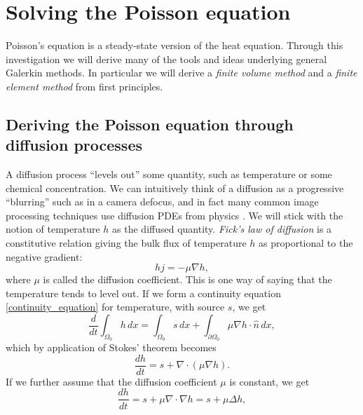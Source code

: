 \documentclass[11pt,a4paper]{memoir}
\newcommand{\pomn}{{\partial\Omega_0}}
\begin{document}
\section{Solving the Poisson equation}
Poisson's equation is a steady-state version of the heat equation.
Through this investigation we will derive many of the tools and ideas underlying general Galerkin methods.
In particular we will derive a \textit{finite volume method} and a \textit{finite element method} from first principles.

\subsection{Deriving the Poisson equation through diffusion processes}
A diffusion process ``levels out'' some quantity, such as temperature or some chemical concentration. We can intuitively think of a diffusion as a
progressive ``blurring''
such as in a camera defocus, and in fact many common image processing techniques use diffusion PDEs from physics \cite{tum}. We will stick with
the notion of temperature $h$ as the diffused quantity.
\textit{Fick's law of diffusion} is a constitutive relation giving the bulk flux of temperature $h$ as proportional to the negative gradient:
    $$hj = -\mu\nabla h,$$
where $\mu$ is called the diffusion coefficient.
This is one way of saying that the temperature tends to level out.
If we form a continuity equation \eqref{continuity_equation} for temperature, with source $s$, we get
\begin{equation}\label{heat_equation_integral}
    \frac{d}{dt} \int_{\Omega_0} h\,dx = \int_{\Omega_0} s\,dx + \int_{\pomn} \mu \nabla h \cdot \hat{n}\,dx,
\end{equation}
which by application of Stokes' theorem becomes
\begin{equation}\label{heat_equation_differential}
    \frac{dh}{dt} = s + \nabla \cdot \left(\mu \nabla h\right).
\end{equation}
If we further assume that the diffusion coefficient $\mu$ is constant, we get
\begin{equation}\label{heat_equation_differential_constant}
    \frac{dh}{dt} = s + \mu\nabla \cdot \nabla h = s + \mu\Delta h,
\end{equation}
\end{document}
